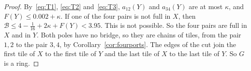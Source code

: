 \begin{proof}
By~\eqref{eq:T1}, \eqref{eq:T2} and~\eqref{eq:T3}, $a_{12}(Y)$ and $a_{34}(Y)$ are at most
$\kappa$, and $F(Y)\le0.002+\kappa$. If one of the four pairs is not full in $X$, then
$\mathcal B\le4-\frac1{16}+2\kappa+F(Y)<3.95$. This is not possible. So the four pairs are full
in $X$ and in $Y$. Both poles have no bridge, so they are chains of tiles, from the pair $1,2$ to
the pair $3,4$, by Corollary~\ref{cor:fourports}. The edges of the cut join the first tile of $X$
to the first tile of $Y$ and the last tile of $X$ to the last tile of $Y$. So $G$ is a ring.
\end{proof}
